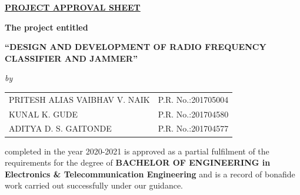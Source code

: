 \begin{center}
%
\underline{\bfseries \huge PROJECT APPROVAL SHEET}\\
\vspace{0.4cm}
\begin{figure}[H]
{\centering {}\par}
\end{figure}
\vspace{-0.6cm}
{\bfseries The project entitled}\\
\vspace{0.2cm}
\begin{large}
{\bfseries ``DESIGN AND DEVELOPMENT OF RADIO FREQUENCY CLASSIFIER AND JAMMER''}\\
\end{large}
\vspace{0.1cm}
\begin{small}
\emph{by}\\
\end{small}
\vspace{0.1cm}
\begin{table}[H]
\normalsize
\bfseries
\begin{center}
\begin{tabular}{ll}
PRITESH ALIAS VAIBHAV V. NAIK \hspace{1cm} & P.R. No.:201705004\\
KUNAL K. GUDE & P.R. No.:201704580\\
ADITYA D. S. GAITONDE & P.R. No.:201704577\\
\end{tabular}
\end{center}
\end{table}
\vspace{-1.6cm}
\end{center}
\noindent completed in the year 2020-2021 is approved as a partial fulfilment of the requirements for the degree of {\bfseries BACHELOR OF ENGINEERING in Electronics \& Telecommunication Engineering} and is a record of bonafide work carried out successfully under our guidance.\\




